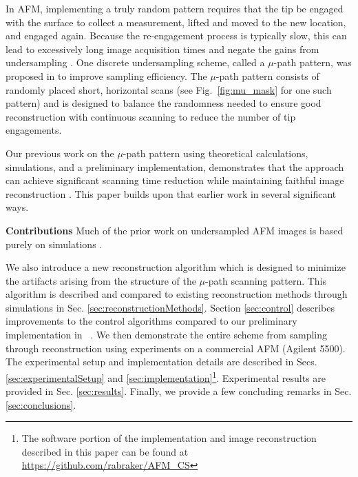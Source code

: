 \documentclass[twocolumn,oneside]{IEEEtran/IEEEtran}
\begin{document}
In AFM, implementing a truly random pattern requires that the tip be engaged
with the surface to collect a measurement, lifted and moved to the new location,
and engaged again. Because the re-engagement process is typically slow, this can
lead to excessively long image acquisition times and negate the gains from
undersampling \cite{andersson2012non}. One discrete undersampling scheme, called
a $\mu$-path pattern, was proposed in \cite{maxwell2014compressed} to improve
sampling efficiency. The $\mu$-path pattern consists of randomly placed short,
horizontal scans (see Fig.~\ref{fig:mu_mask} for one such pattern) and is
designed to balance the randomness needed to ensure good reconstruction with
continuous scanning to reduce the number of tip
engagements. %

Our previous work on the $\mu$-path pattern using theoretical calculations,
simulations, and a preliminary implementation, demonstrates that the approach
can achieve significant scanning time reduction while maintaining faithful image
reconstruction \cite{maxwell2014compressed,Luo:2015tu, braker_hardware_2018}. This paper
builds upon that earlier work in several significant ways.

\textbf{Contributions}
Much of the prior work on undersampled AFM images is based purely on simulations \cite{han_optimal_2018, Luo_nano_2015, oxvig_structure_2017, jensen_reconstruction_2013, maxwell_acc_2014, Chen_2012jx}. 

We also introduce a new reconstruction
algorithm which is designed to minimize the artifacts arising from the structure
of the $\mu$-path scanning pattern. This algorithm is described and compared to
existing reconstruction methods through simulations in Sec.
\ref{sec:reconstructionMethods}.
Section \ref{sec:control} describes improvements to the control algorithms compared to our preliminary implementation in ~\cite{braker_hardware_2018}.
We then demonstrate the entire scheme from
sampling through reconstruction using experiments on a commercial AFM (Agilent
5500). The experimental setup and implementation details are described in Secs.
\ref{sec:experimentalSetup} and \ref{sec:implementation}\footnote{The software
  portion of the implementation and image reconstruction described in this paper
  can be found at \url{https://github.com/rabraker/AFM_CS}}. Experimental results are provided in Sec.
\ref{sec:results}. Finally, we provide a few concluding remarks in
Sec. \ref{sec:conclusions}.
\end{document}
